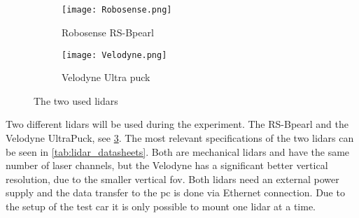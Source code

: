 \subsection{}
\begin{figure}[htbp]
	\centering
	\begin{subfigure}{0.3\textwidth}
		\centering
		\texttt{[image: Robosense.png]}
		\caption{Robosense RS-Bpearl \cite{RoboSense2020}}
		\label{fig:lidar_robosense}
	\end{subfigure}
	\begin{subfigure}{0.3\textwidth}
		\centering
		\texttt{[image: Velodyne.png]}
		\caption{Velodyne Ultra puck \cite{Velodyne2018}}
		\label{fig:lidar_velodyne}
	\end{subfigure}
	\caption{The two used \glspl{lidar}}
	\label{fig:lidars_used}
\end{figure}
Two different \glspl{lidar} will be used during the experiment.
The RS-Bpearl and the Velodyne UltraPuck, see \cref{fig:lidars_used}.
The most relevant specifications of the two \glspl{lidar} can be seen in \cref{tab:lidar_datasheets}.
Both are mechanical \glspl{lidar} and have the same number of laser channels, but the Velodyne has a significant better vertical resolution, due to the smaller vertical \gls{fov}.
Both \glspl{lidar} need an external power supply and the data transfer to the pc is done via Ethernet connection.
Due to the setup of the test car it is only possible to mount one \gls{lidar} at a time.
